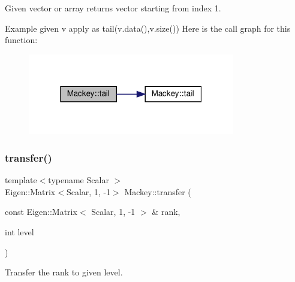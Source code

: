 Given vector or array returns vector starting from index 1. 

Example given v apply as tail(v.\+data(),v.\+size()) Here is the call graph for this function\+:\nopagebreak
\begin{figure}[H]
\begin{center}
\leavevmode
\includegraphics[width=256pt]{namespaceMackey_a4403b34f0680dfccf2ab79111f832ba3_cgraph}
\end{center}
\end{figure}
\mbox{\label{namespaceMackey_a671613d53fc3b0c9c4b115bc8b2797e6}} 
\subsubsection{\texorpdfstring{transfer()}{transfer()}\hspace{0.1cm}{\footnotesize\ttfamily [1/6]}}
{\footnotesize\ttfamily template$<$typename Scalar $>$ \\
Eigen\+::\+Matrix$<$Scalar, 1, -\/1$>$ Mackey\+::transfer (\begin{DoxyParamCaption}\item[{const Eigen\+::\+Matrix$<$ Scalar, 1, -\/1 $>$ \&}]{rank,  }\item[{int}]{level }\end{DoxyParamCaption})}



Transfer the rank to given level. 

